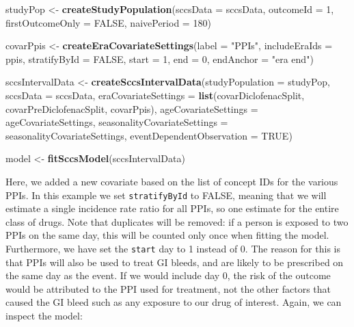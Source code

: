 \documentclass[
]{article}
\newenvironment{Shaded}{\begin{snugshade}}{\end{snugshade}}
\newcommand{\DataTypeTok}[1]{\textcolor[rgb]{0.13,0.29,0.53}{#1}}
\newcommand{\DecValTok}[1]{\textcolor[rgb]{0.00,0.00,0.81}{#1}}
\newcommand{\KeywordTok}[1]{\textcolor[rgb]{0.13,0.29,0.53}{\textbf{#1}}}
\newcommand{\NormalTok}[1]{#1}
\newcommand{\OtherTok}[1]{\textcolor[rgb]{0.56,0.35,0.01}{#1}}
\newcommand{\StringTok}[1]{\textcolor[rgb]{0.31,0.60,0.02}{#1}}
\begin{document}
\begin{Shaded}
\begin{Highlighting}[]
\NormalTok{studyPop <-}\StringTok{ }\KeywordTok{createStudyPopulation}\NormalTok{(}\DataTypeTok{sccsData =}\NormalTok{ sccsData,}
                                  \DataTypeTok{outcomeId =} \DecValTok{1}\NormalTok{,}
                                  \DataTypeTok{firstOutcomeOnly =} \OtherTok{FALSE}\NormalTok{,}
                                  \DataTypeTok{naivePeriod =} \DecValTok{180}\NormalTok{)}

\NormalTok{covarPpis <-}\StringTok{ }\KeywordTok{createEraCovariateSettings}\NormalTok{(}\DataTypeTok{label =} \StringTok{"PPIs"}\NormalTok{,}
                                        \DataTypeTok{includeEraIds =}\NormalTok{ ppis,}
                                        \DataTypeTok{stratifyById =} \OtherTok{FALSE}\NormalTok{,}
                                        \DataTypeTok{start =} \DecValTok{1}\NormalTok{,}
                                        \DataTypeTok{end =} \DecValTok{0}\NormalTok{,}
                                        \DataTypeTok{endAnchor =} \StringTok{"era end"}\NormalTok{)}

\NormalTok{sccsIntervalData <-}\StringTok{ }\KeywordTok{createSccsIntervalData}\NormalTok{(}\DataTypeTok{studyPopulation =}\NormalTok{ studyPop,}
                                           \DataTypeTok{sccsData =}\NormalTok{ sccsData,}
                                           \DataTypeTok{eraCovariateSettings =} \KeywordTok{list}\NormalTok{(covarDiclofenacSplit,}
\NormalTok{                                                                       covarPreDiclofenacSplit,}
\NormalTok{                                                                       covarPpis),}
                                           \DataTypeTok{ageCovariateSettings =}\NormalTok{ ageCovariateSettings,}
                                           \DataTypeTok{seasonalityCovariateSettings =}\NormalTok{ seasonalityCovariateSettings,}
                                           \DataTypeTok{eventDependentObservation =} \OtherTok{TRUE}\NormalTok{)}

\NormalTok{model <-}\StringTok{ }\KeywordTok{fitSccsModel}\NormalTok{(sccsIntervalData)}
\end{Highlighting}
\end{Shaded}

Here, we added a new covariate based on the list of concept IDs for the
various PPIs. In this example we set \texttt{stratifyById} to FALSE,
meaning that we will estimate a single incidence rate ratio for all
PPIs, so one estimate for the entire class of drugs. Note that
duplicates will be removed: if a person is exposed to two PPIs on the
same day, this will be counted only once when fitting the model.
Furthermore, we have set the \texttt{start} day to 1 instead of 0. The
reason for this is that PPIs will also be used to treat GI bleeds, and
are likely to be prescribed on the same day as the event. If we would
include day 0, the risk of the outcome would be attributed to the PPI
used for treatment, not the other factors that caused the GI bleed such
as any exposure to our drug of interest. Again, we can inspect the
model:
\end{document}
